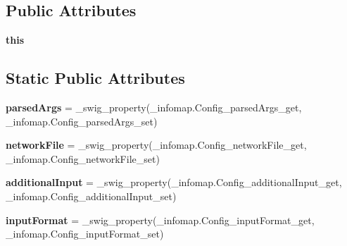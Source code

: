 \subsection*{Public Attributes}
\begin{DoxyCompactItemize}
\item 
\mbox{\label{classdsmacc_1_1graph_1_1infomap_1_1Config_ae3dade850c2caa8b41929dbf815f2539}} 
{\bfseries this}
\end{DoxyCompactItemize}
\subsection*{Static Public Attributes}
\begin{DoxyCompactItemize}
\item 
\mbox{\label{classdsmacc_1_1graph_1_1infomap_1_1Config_abb13ca07fca02ae85852dd4c57d95893}} 
{\bfseries parsed\+Args} = \+\_\+swig\+\_\+property(\+\_\+infomap.\+Config\+\_\+parsed\+Args\+\_\+get, \+\_\+infomap.\+Config\+\_\+parsed\+Args\+\_\+set)
\item 
\mbox{\label{classdsmacc_1_1graph_1_1infomap_1_1Config_a68319bb28804aedc710b14c2d65c0f59}} 
{\bfseries network\+File} = \+\_\+swig\+\_\+property(\+\_\+infomap.\+Config\+\_\+network\+File\+\_\+get, \+\_\+infomap.\+Config\+\_\+network\+File\+\_\+set)
\item 
\mbox{\label{classdsmacc_1_1graph_1_1infomap_1_1Config_a9006478b577efbfe6163200778285402}} 
{\bfseries additional\+Input} = \+\_\+swig\+\_\+property(\+\_\+infomap.\+Config\+\_\+additional\+Input\+\_\+get, \+\_\+infomap.\+Config\+\_\+additional\+Input\+\_\+set)
\item 
\mbox{\label{classdsmacc_1_1graph_1_1infomap_1_1Config_aeaef6ab99fad289df08833a4c8aadf84}} 
{\bfseries input\+Format} = \+\_\+swig\+\_\+property(\+\_\+infomap.\+Config\+\_\+input\+Format\+\_\+get, \+\_\+infomap.\+Config\+\_\+input\+Format\+\_\+set)
\item 
\mbox{\label{classdsmacc_1_1graph_1_1infomap_1_1Config_aaf9dd0b62bc61797d5cf0f6602f3cfe8}} 

\end{DoxyCompactItemize}
